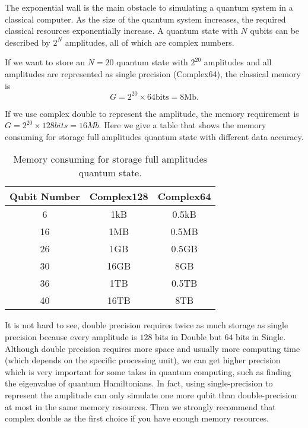The exponential wall is the main obstacle to simulating a quantum system in a classical computer.
As the size of the quantum system increases, the required classical resources exponentially increase.
A quantum state with $N$ qubits can be described by $2^N$ amplitudes, all of which are complex numbers.

If we want to store an $N=20$ quantum state with $2^{20}$ amplitudes and all amplitudes are represented as single precision (Complex64), the classical memory is
\begin{equation}
    G=2^{20}\times 64 \mathrm{bits} = 8 \mathrm{Mb}.
\end{equation}

If we use complex double to represent the amplitude, the memory requirement is $G=2^{20}\times 128 bits=16 Mb$. Here we give a table that shows the memory consuming for storage full amplitudes quantum state with different data accuracy.

\begin{table}[ht]
    \begin{tabular}{ccc}
        \toprule
        Qubit Number & Complex128 & Complex64 \\
        \midrule
        6            & 1kB        & 0.5kB     \\
        16           & 1MB        & 0.5MB     \\
        26           & 1GB        & 0.5GB     \\
        30           & 16GB       & 8GB       \\
        36           & 1TB        & 0.5TB     \\
        40           & 16TB       & 8TB       \\
        \bottomrule
    \end{tabular}
    \caption{Memory consuming for storage full amplitudes quantum state.}
    \label{tab:mem_consume}
\end{table}

It is not hard to see, double precision requires twice as much storage as single precision because every amplitude is $128$ bits in Double but $64$ bits in Single.
Although double precision requires more space and usually more computing time (which depends on the specific processing unit), we can get higher precision which is very important for some takes in quantum computing, such as finding the eigenvalue of quantum Hamiltonians.
In fact, using single-precision to represent the amplitude can only simulate one more qubit than double-precision at most in the same memory resources.
Then we strongly recommend that complex double as the first choice if you have enough memory resources.